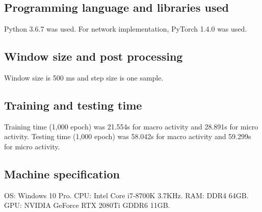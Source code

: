 \documentclass{svmult}
\begin{document}
\subsection*{Programming language and libraries used}
Python 3.6.7 was used. For network implementation, PyTorch 1.4.0 was used.

\subsection*{Window size and post processing}
Window size is 500 ms and step size is one sample.

\subsection*{Training and testing time}
Training time (1,000 epoch) was 21.554s for macro activity and 28.891s for micro activity.
Testing time (1,000 epoch) was 58.042s for macro activity and 59.299s for micro activity.

\subsection*{Machine specification}
OS: Windows 10 Pro. CPU: Intel Core i7-8700K 3.7KHz. RAM: DDR4 64GB. GPU: NVIDIA GeForce RTX 2080Ti GDDR6 11GB.

%
\end{document}
